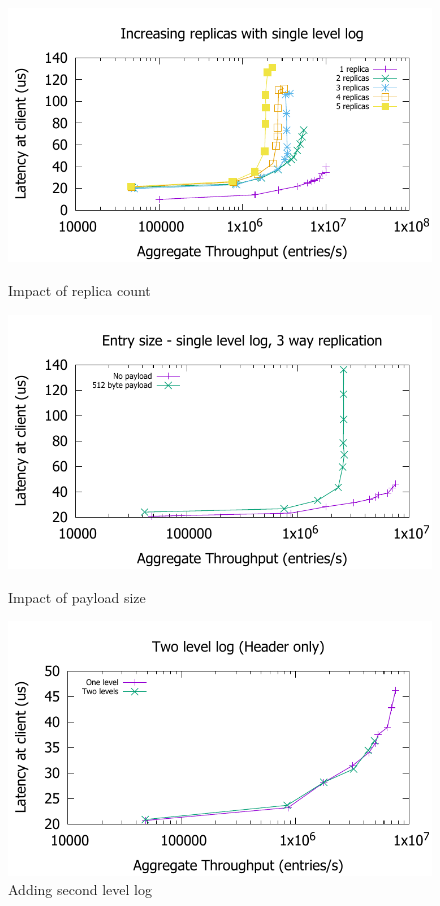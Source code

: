 \documentclass[letterpaper,twocolumn,10pt]{article}
\begin{document}
\begin{figure}
\begin{minipage}{0.33\textwidth}
  \includegraphics[scale=0.45]{results2/replicas.pdf}
  \caption{Impact of replica count}
  \label{fig:replicas}
\end{minipage}
\begin{minipage}{.33\textwidth}
  \includegraphics[scale=0.45]{results2/512.pdf}
  \caption{Impact of payload size}
  \label{fig:payload}
\end{minipage}
\begin{minipage}{.33\textwidth}
  \includegraphics[scale=0.45]{results2/flashlog.pdf}
  \caption{Adding second level log}
  \label{fig:flashlog}
\end{minipage}
\end{figure}
\end{document}
